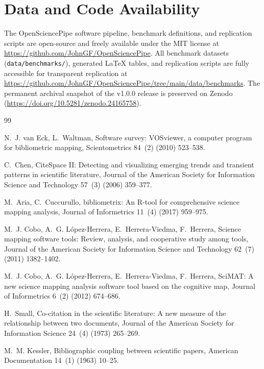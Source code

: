 \documentclass[preprint,12pt]{elsarticle}
\begin{document}
\section*{Data and Code Availability}
The OpenSciencePipe software pipeline, benchmark definitions, and replication scripts are open-source and freely available under the MIT license at \url{https://github.com/JohnGF/OpenSciencePipe}. All benchmark datasets (\texttt{data/benchmarks/}), generated \LaTeX{} tables, and replication scripts are fully accessible for transparent replication at \url{https://github.com/JohnGF/OpenSciencePipe/tree/main/data/benchmarks}. The permanent archival snapshot of the v1.0.0 release is preserved on Zenodo (\url{https://doi.org/10.5281/zenodo.24165758}).


\begin{thebibliography}{99}

N.~J. van Eck, L.~Waltman, Software survey: VOSviewer, a computer program for bibliometric mapping, Scientometrics 84~(2) (2010) 523--538.

C.~Chen, CiteSpace II: Detecting and visualizing emerging trends and transient patterns in scientific literature, Journal of the American Society for Information Science and Technology 57~(3) (2006) 359--377.

M.~Aria, C.~Cuccurullo, bibliometrix: An R-tool for comprehensive science mapping analysis, Journal of Informetrics 11~(4) (2017) 959--975.

M.~J. Cobo, A.~G. L{\'o}pez-Herrera, E.~Herrera-Viedma, F.~Herrera, Science mapping software tools: Review, analysis, and cooperative study among tools, Journal of the American Society for Information Science and Technology 62~(7) (2011) 1382--1402.

M.~J. Cobo, A.~G. L{\'o}pez-Herrera, E.~Herrera-Viedma, F.~Herrera, SciMAT: A new science mapping analysis software tool based on the cognitive map, Journal of Informetrics 6~(2) (2012) 674--686.

H.~Small, Co-citation in the scientific literature: A new measure of the relationship between two documents, Journal of the American Society for Information Science 24~(4) (1973) 265--269.

M.~M. Kessler, Bibliographic coupling between scientific papers, American Documentation 14~(1) (1963) 10--25.


\end{thebibliography}
\end{document}
